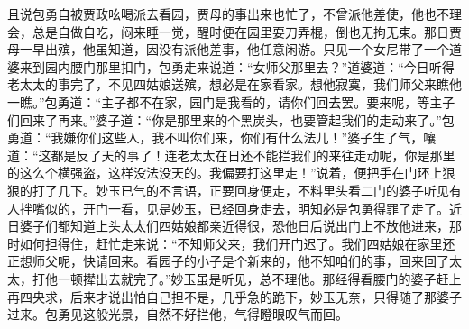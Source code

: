 \begin{parag}
    且说包勇自被贾政吆喝派去看园，贾母的事出来也忙了，不曾派他差使，他也不理会，总是自做自吃，闷来睡一觉，醒时便在园里耍刀弄棍，倒也无拘无束。那日贾母一早出殡，他虽知道，因没有派他差事，他任意闲游。只见一个女尼带了一个道婆来到园内腰门那里扣门，包勇走来说道：“女师父那里去？”道婆道：“今日听得老太太的事完了，不见四姑娘送殡，想必是在家看家。想他寂寞，我们师父来瞧他一瞧。”包勇道：“主子都不在家，园门是我看的，请你们回去罢。要来呢，等主子们回来了再来。”婆子道：“你是那里来的个黑炭头，也要管起我们的走动来了。”包勇道：“我嫌你们这些人，我不叫你们来，你们有什么法儿！”婆子生了气，嚷道：“这都是反了天的事了！连老太太在日还不能拦我们的来往走动呢，你是那里的这么个横强盗，这样没法没天的。我偏要打这里走！”说着，便把手在门环上狠狠的打了几下。妙玉已气的不言语，正要回身便走，不料里头看二门的婆子听见有人拌嘴似的，开门一看，见是妙玉，已经回身走去，明知必是包勇得罪了走了。近日婆子们都知道上头太太们四姑娘都亲近得很，恐他日后说出门上不放他进来，那时如何担得住，赶忙走来说：“不知师父来，我们开门迟了。我们四姑娘在家里还正想师父呢，快请回来。看园子的小子是个新来的，他不知咱们的事，回来回了太太，打他一顿撵出去就完了。”妙玉虽是听见，总不理他。那经得看腰门的婆子赶上再四央求，后来才说出怕自己担不是，几乎急的跪下，妙玉无奈，只得随了那婆子过来。包勇见这般光景，自然不好拦他，气得瞪眼叹气而回。
\end{parag}


